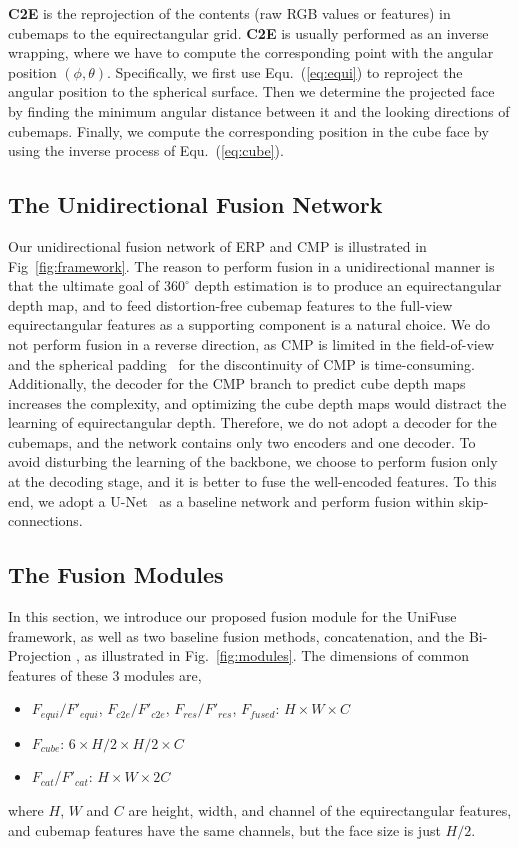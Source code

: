 \documentclass[letterpaper, 10 pt, conference]{ieeeconf}
\begin{document}
\textbf{C2E} is the reprojection of the contents (raw RGB values or features) in cubemaps to the equirectangular grid. \textbf{C2E} is usually performed as an inverse wrapping, where we have to compute the corresponding point with the angular position $(\phi, \theta)$. Specifically, we first use Equ.~(\ref{eq:equi}) to reproject the angular position to the spherical surface. Then we determine the projected face by finding the minimum angular distance between it and the looking directions of cubemaps. Finally, we compute the corresponding position in the cube face by using the inverse process of Equ.~(\ref{eq:cube}). 


\subsection{The Unidirectional Fusion Network}
Our unidirectional fusion network of ERP and CMP is illustrated in Fig~\ref{fig:framework}.
The reason to perform fusion in a unidirectional manner is that
the ultimate goal of $360^{\circ}$ depth estimation is to produce an equirectangular depth map, and to feed distortion-free cubemap features to the full-view equirectangular features as a supporting component is a natural choice. We do not perform fusion in a reverse direction, as CMP is limited in the field-of-view and the spherical padding~\cite{wang2020bifuse} for the discontinuity of CMP is time-consuming. 
Additionally, the decoder for the CMP branch to predict cube depth maps increases the complexity, and optimizing the cube depth maps would distract the learning of equirectangular depth. Therefore, we do not adopt a decoder for the cubemaps, and the network contains only two encoders and one decoder. 
To avoid disturbing the learning of the backbone, we choose to perform fusion only at the decoding stage, and it is better to fuse the well-encoded features. To this end, we adopt a U-Net~\cite{ronneberger2015u} as a baseline network and perform fusion within skip-connections.


\subsection{The Fusion Modules}
In this section, we introduce our proposed fusion module for the UniFuse framework, as well as two baseline fusion methods, concatenation, and the Bi-Projection \cite{wang2020bifuse}, as illustrated in Fig.~\ref{fig:modules}. The dimensions of common features of these 3 modules are,
\begin{itemize}
\item $F_{equi}/F'_{equi}$, $F_{c2e}/F'_{c2e}$, $F_{res}/F'_{res}$, $F_{fused}$: $H \times W \times C$
\item $F_{cube}$: $ 6 \times H/2 \times H/2 \times C$
\item $F_{cat}$/$F'_{cat}$: $H \times W \times 2C$
\end{itemize}
where $H$, $W$ and $C$ are height, width, and channel of the equirectangular features, and cubemap features have the same channels, but the face size is just $H/2$.
\end{document}
